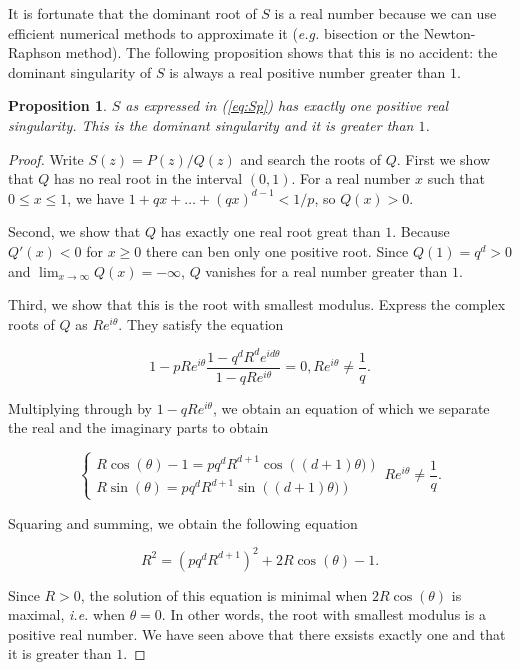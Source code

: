 \documentclass{article}
\newtheorem{proposition}{Proposition}
\begin{document}
It is fortunate that the dominant root of $S$ is a real number because we
can use efficient numerical methods to approximate it (\textit{e.g.}
bisection or the Newton-Raphson method). The following proposition shows
that this is no accident: the dominant singularity of $S$ is always a real
positive number greater than $1$.

\begin{proposition}
\label{th:roots}
$S$ as expressed in (\ref{eq:Sp}) has exactly one positive real
singularity. This is the dominant singularity and it is greater than $1$.
\end{proposition}

\begin{proof}
Write $S(z) = P(z)/Q(z)$ and search the roots of $Q$. First we show that
$Q$ has no real root in the interval $(0,1)$. For a real number $x$ such
that $0\leq x \leq 1$, we have $1+qx+\ldots+(qx)^{d-1} < 1/p$, so $Q(x) >
0$.

Second, we show that $Q$ has exactly one real root great than $1$. Because
$Q'(x) < 0$ for $x \geq 0$ there can ben only one positive root.  Since
$Q(1) = q^d > 0$ and $\lim_{x\rightarrow \infty} Q(x) = -\infty$, $Q$
vanishes for a real number greater than $1$.

Third, we show that this is the root with smallest modulus.  Express the
complex roots of $Q$ as $Re^{i\theta}$. They satisfy the equation

\begin{equation*}
1-pRe^{i\theta}\frac{1-q^dR^de^{id\theta}}{1-qRe^{i\theta}} = 0,
Re^{i\theta} \neq \frac{1}{q}.
\end{equation*}

Multiplying through by $1-qRe^{i\theta}$, we obtain an equation of which
we separate the real and the imaginary parts to obtain

\begin{equation*}
\left\{
\begin{array}{ll}
R \cos (\theta) -1 = pq^dR^{d+1} \cos \left( (d+1) \theta) \right) \\
R \sin (\theta) = pq^dR^{d+1} \sin \left( (d+1) \theta) \right)
\end{array}
\right. Re^{i\theta} \neq \frac{1}{q}.
\end{equation*}

Squaring and summing, we obtain the following equation

\begin{equation*}
R^2 = (pq^dR^{d+1})^2 + 2R \cos(\theta) -1.
\end{equation*}

Since $R > 0$, the solution of this equation is minimal when
$2R\cos(\theta)$ is maximal, \textit{i.e.} when $\theta = 0$. In other
words, the root with smallest modulus is a positive real number. We have
seen above that there exsists exactly one and that it is greater than $1$.
\end{proof}
\end{document}
